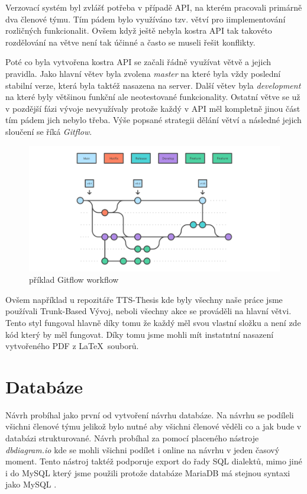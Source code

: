 
Verzovací systém byl zvlášť potřeba v případě API, na kterém pracovali primárně dva členové týmu. Tím pádem bylo využíváno tzv. větví pro iimplementování rozličných funkcionalit. Ovšem když ještě nebyla kostra API tak takovéto rozdělování na větve není tak účinné a často se museli řešit konflikty. 

Poté co byla vytvořena kostra API se začali řádně využívat větvě a jejich pravidla. Jako hlavní větev byla zvolena \textit{master} na které byla vždy poslední stabilní verze, která byla taktéž nasazena na server. Další větev byla \textit{development} na které byly většinou funkční ale neotestované funkcionality. Ostatní větve se už v pozdější fázi vývoje nevyužívaly protože každý v API měl kompletně jinou část tím pádem jich nebylo třeba.
Výše popsané strategii dělání větví a následné jejich sloučení se říká \textit{Gitflow}.

\begin{figure}[H]
    \centering
    \includegraphics[width=\textwidth]{figures/impl/git-flow.png}
    \caption{příklad Gitflow workflow}
    \label{fig:gitflow}
\end{figure}



Ovšem například u repozitáře TTS-Thesis kde byly všechny naše práce jsme používali Trunk-Based Vývoj, neboli všechny akce se prováděli na hlavní větvi. Tento styl fungoval hlavně díky tomu že každý měl svou vlastní složku a není zde kód který by měl fungovat. Díky tomu jsme mohli mít instatntní nasazení vytvořeného PDF z \LaTeX ~souborů.

\section{Databáze}\label{sec:database}
Návrh probíhal jako první od vytvoření návrhu databáze. Na návrhu se podíleli všichni členové týmu  jelikož bylo nutné aby všichni členové věděli co a jak bude v databázi strukturované. Návrh probíhal za pomocí placeného nástroje \textit{dbdiagram.io} kde se mohli všichni podílet i online na návrhu v jeden časový moment. Tento nástroj taktéž podporuje export do řady SQL dialektů, mimo jiné i do MySQL který jsme použili protože databáze MariaDB má stejnou syntaxi jako MySQL . 

